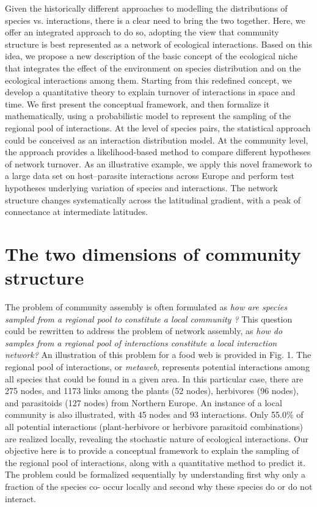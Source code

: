 \documentclass[12pt]{article}
\begin{document}
Given the historically different approaches to modelling the distributions of
species vs. interactions, there is a clear need to bring the two together.
Here, we offer an integrated approach to do so, adopting the view that
community structure is best represented as a network of ecological
interactions. Based on this idea, we propose a new description of the basic
concept of the ecological niche that integrates the effect of the environment
on species distribution and on the ecological interactions among them.
Starting from this redefined concept, we develop a quantitative theory to
explain turnover of interactions in space and time. We first present the
conceptual framework, and then formalize it mathematically, using a
probabilistic model to represent the sampling of the regional pool of
interactions. At the level of species pairs, the statistical approach could be
conceived as an interaction distribution model. At the community level, the
approach provides a likelihood-based method to compare different hypotheses of
network turnover. As an illustrative example, we apply this novel framework to
a large data set on host–parasite interactions across Europe and perform test
hypotheses underlying variation of species and interactions. The network
structure changes systematically across the latitudinal gradient, with a peak
of connectance at intermediate latitudes.

\section*{The two dimensions of community structure}

The problem of community assembly is often formulated as \textit{how are
species sampled from a regional pool to constitute a local community
\citep{Gotzenberger2012}?} This question could be rewritten to address the
problem of network assembly, as \textit{how do samples from a regional pool of
interactions constitute a local interaction network?} An illustration of this
problem for a food web is provided in Fig. 1. The regional pool of
interactions, or \emph{metaweb}, represents potential interactions among all
species that could be found in a given area. In this particular case, there
are 275 nodes, and 1173 links among the plants (52 nodes), herbivores (96
nodes), and parasitoids (127 nodes) from Northern Europe. An instance of a
local community is also illustrated, with 45 nodes and 93 interactions. Only
55.0\% of all potential interactions (plant-herbivore or herbivore parasitoid
combinations) are realized locally, revealing the stochastic nature of
ecological interactions. Our objective here is to provide a conceptual
framework to explain the sampling of the regional pool of interactions, along
with a quantitative method to predict it. The problem could be formalized
sequentially by understanding first why only a fraction of the species co-
occur locally and second why these species do or do not interact.
\end{document}
